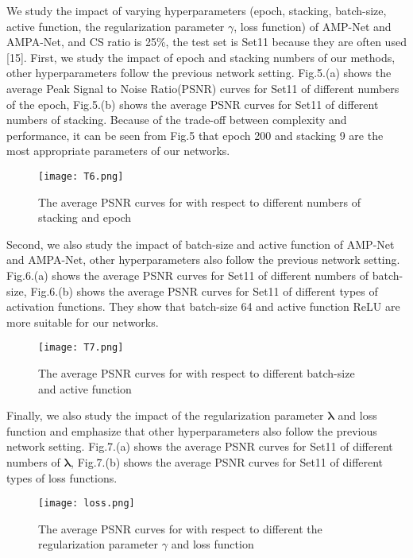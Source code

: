 \documentclass[conference]{IEEEtran}
\begin{document}
We study the impact of varying hyperparameters (epoch, stacking, batch-size, active function, the regularization parameter $\gamma$, loss function) of AMP-Net and AMPA-Net,  and CS ratio is {25\%}, the test set is Set11 because they are often used [15]. 
First, we study the impact of epoch and stacking numbers of our methods, other hyperparameters follow the previous network setting. Fig.5.(a) shows the average Peak Signal to Noise Ratio(PSNR) curves for Set11 of different numbers of the epoch, Fig.5.(b) shows the average PSNR curves for Set11 of different numbers of stacking. Because of the trade-off between complexity and performance, it can be seen from Fig.5 that epoch 200 and stacking 9 are the most appropriate parameters of our networks.
\begin{figure}[h]
\centering
\texttt{[image: T6.png]} \caption{The average PSNR curves for with respect to different numbers of stacking and epoch}
\label{T6} \end{figure}

Second, we also study the impact of batch-size and active function of AMP-Net and AMPA-Net, other hyperparameters also follow the previous network setting. Fig.6.(a) shows the average PSNR curves for Set11 of different numbers of batch-size, Fig.6.(b) shows the average PSNR curves for Set11 of different types of activation functions. They show that batch-size 64 and active function ReLU are more suitable for our networks.
\begin{figure}[h]
\centering
\texttt{[image: T7.png]} \caption{The average PSNR curves for with respect to different batch-size and active function}
\label{T7} \end{figure}
Finally, we also study the impact of the regularization parameter $\bm{\lambda}$ and loss function and emphasize that other hyperparameters also follow the previous network setting. Fig.7.(a) shows the average PSNR curves for Set11 of different numbers of  $\bm{\lambda}$, Fig.7.(b) shows the average PSNR curves for Set11 of different types of loss functions.
\begin{figure}[h]
\centering
\texttt{[image: loss.png]} \caption{The average PSNR curves for with respect to different the regularization parameter $\gamma$ and loss function}
\label{F3} \end{figure}
\end{document}
